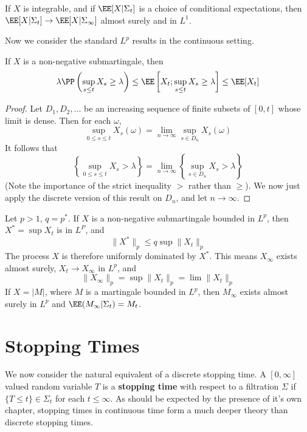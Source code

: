 \begin{theorem}
    If $X$ is integrable, and if $\EE[X|\Sigma_t]$ is a \cadlag choice of conditional expectations, then $\EE[X|\Sigma_t] \to \EE[X|\Sigma_\infty]$ almost surely and in $L^1$.
\end{theorem}

Now we consider the standard $L^p$ results in the continuous setting.

\begin{theorem}
    If $X$ is a non-negative \cadlag submartingale, then
    \[ \lambda \PP \left( \sup_{s \leq t} X_s \geq \lambda \right) \leq \EE \left[X_t; \sup_{s \leq t} X_s \geq \lambda \right] \leq \EE[X_t] \]
\end{theorem}
\begin{proof}
    Let $D_1, D_2, \dots$ be an increasing sequence of finite subsets of $[0,t]$ whose limit is dense. Then for each $\omega$,
    \[ \sup_{0 \leq s \leq t} X_s(\omega) = \lim_{n \to \infty} \sup_{s \in D_n} X_s(\omega) \]
    It follows that
    \[ \left\{ \sup_{0 \leq s \leq t} X_s > \lambda \right\} = \lim_{n \to \infty} \left\{ \sup_{s \in D_n} X_s > \lambda \right\} \]
    (Note the importance of the strict inequality $>$ rather than $\geq$). We now just apply the discrete version of this result on $D_n$, and let $n \to \infty$.
\end{proof}

\begin{theorem}
    Let $p > 1$, $q = p^*$. If $X$ is a non-negative \cadlag submartingale bounded in $L^p$, then $X^* = \sup X_t$ is in $L^P$, and
    \[ \| X^* \|_p \leq q \sup \| X_t \|_p \]
    The process $X$ is therefore uniformly dominated by $X^*$. This means $X_\infty$ exists almost surely, $X_t \to X_\infty$ in $L^p$, and
    \[ \|X_\infty \|_p = \sup \|X_t \|_p = \lim \| X_t \|_p \]
    If $X = |M|$, where $M$ is a \cadlag martingale bounded in $L^p$, then $M_\infty$ exists almost surely in $L^p$ and $\EE(M_\infty|\Sigma_t) = M_t$.
\end{theorem}

\chapter{Stopping Times}

We now consider the natural equivalent of a discrete stopping time. A $[0,\infty]$ valued random variable $T$ is a {\bf stopping time} with respect to a filtration $\Sigma$ if $\{ T \leq t \} \in \Sigma_t$ for each $t \leq \infty$. As should be expected by the presence of it's own chapter, stopping times in continuous time form a much deeper theory than discrete stopping times.

